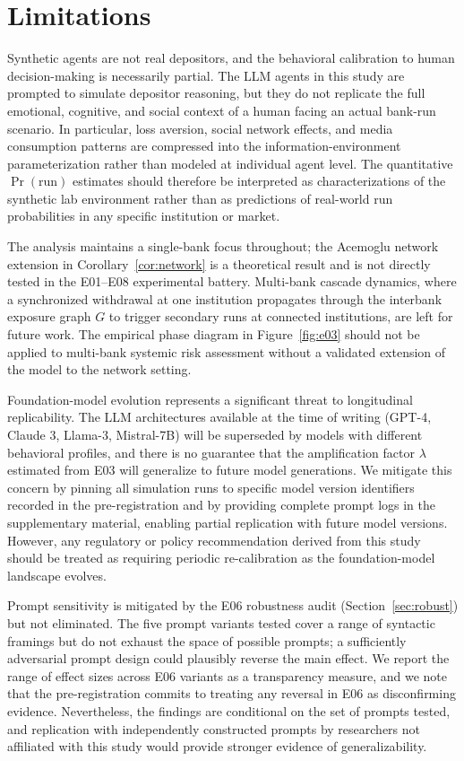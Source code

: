\section{Limitations}
\label{sec:limitations}

Synthetic agents are not real depositors, and the behavioral calibration to human decision-making is necessarily partial. The LLM agents in this study are prompted to simulate depositor reasoning, but they do not replicate the full emotional, cognitive, and social context of a human facing an actual bank-run scenario. In particular, loss aversion, social network effects, and media consumption patterns are compressed into the information-environment parameterization rather than modeled at individual agent level. The quantitative $\Pr(\text{run})$ estimates should therefore be interpreted as characterizations of the synthetic lab environment rather than as predictions of real-world run probabilities in any specific institution or market.

The analysis maintains a single-bank focus throughout; the Acemoglu network extension in Corollary~\ref{cor:network} is a theoretical result and is not directly tested in the E01--E08 experimental battery. Multi-bank cascade dynamics, where a synchronized withdrawal at one institution propagates through the interbank exposure graph $G$ to trigger secondary runs at connected institutions, are left for future work. The empirical phase diagram in Figure~\ref{fig:e03} should not be applied to multi-bank systemic risk assessment without a validated extension of the model to the network setting.

Foundation-model evolution represents a significant threat to longitudinal replicability. The LLM architectures available at the time of writing (GPT-4, Claude 3, Llama-3, Mistral-7B) will be superseded by models with different behavioral profiles, and there is no guarantee that the amplification factor $\lambda$ estimated from E03 will generalize to future model generations. We mitigate this concern by pinning all simulation runs to specific model version identifiers recorded in the pre-registration and by providing complete prompt logs in the supplementary material, enabling partial replication with future model versions. However, any regulatory or policy recommendation derived from this study should be treated as requiring periodic re-calibration as the foundation-model landscape evolves.

Prompt sensitivity is mitigated by the E06 robustness audit (Section~\ref{sec:robust}) but not eliminated. The five prompt variants tested cover a range of syntactic framings but do not exhaust the space of possible prompts; a sufficiently adversarial prompt design could plausibly reverse the main effect. We report the range of effect sizes across E06 variants as a transparency measure, and we note that the pre-registration commits to treating any reversal in E06 as disconfirming evidence. Nevertheless, the findings are conditional on the set of prompts tested, and replication with independently constructed prompts by researchers not affiliated with this study would provide stronger evidence of generalizability.

